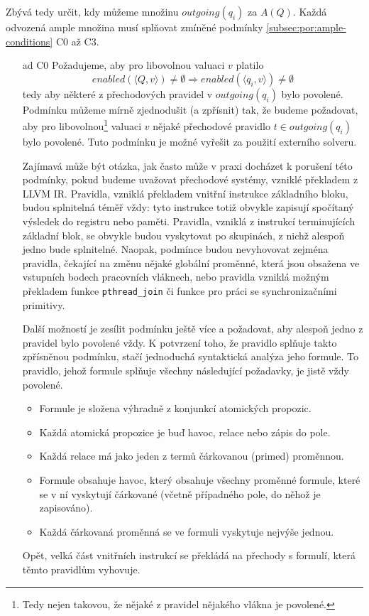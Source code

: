 \documentclass[12pt]{fithesis2}
\newcommand{\tuple}[1]{\langle #1 \rangle}
\begin{document}
Zbývá tedy určit, kdy můžeme množinu $\mathit{outgoing}(q_i)$ za $A(Q)$. Každá odvozená ample množina musí splňovat zmíněné podmínky \ref{subsec:por:ample-conditions} C0 až C3.
\begin{enumerate}
	\item[ad C0] Požadujeme, aby pro libovolnou valuaci $v$ platilo
	\begin{equation}
	\mathit{enabled}(\tuple{Q,v}) \neq \emptyset \Rightarrow \mathit{enabled}(\tuple{q_i,v}) \neq \emptyset
	\end{equation}		
	tedy aby některé z přechodových pravidel v $\mathit{outgoing}(q_i)$ bylo povolené. Podmínku můžeme mírně zjednodušit (a zpřísnit) tak, že budeme požadovat, aby pro libovolnou\footnote{Tedy nejen takovou, že nějaké z pravidel nějakého vlákna je povolené.} valuaci $v$ nějaké přechodové pravidlo $t \in \mathit{outgoing}(q_i)$ bylo povolené. Tuto podmínku je možné vyřešit za použití externího solveru.

	Zajímavá může být otázka, jak často může v praxi docházet k porušení této podmínky, pokud budeme uvažovat přechodové systémy, vzniklé překladem z LLVM IR. Pravidla, vzniklá překladem vnitřní instrukce základního bloku, budou splnitelná téměř vždy: tyto instrukce totiž obvykle zapisují spočítaný výsledek do registru nebo paměti. Pravidla, vzniklá z instrukcí terminujících základní blok, se obvykle budou vyskytovat po skupinách, z nichž alespoň jedno bude splnitelné. Naopak, podmínce budou nevyhovovat zejména pravidla, čekající na změnu nějaké globální proměnné, která jsou obsažena ve vstupních bodech pracovních vláknech, nebo pravidla vzniklá možným překladem funkce \texttt{pthread\_join} či funkce pro práci se synchronizačními primitivy.

	Další možností je zesílit podmínku ještě více a požadovat, aby alespoň jedno z pravidel bylo povolené vždy. K potvrzení toho, že pravidlo splňuje takto zpřísněnou podmínku, stačí jednoduchá syntaktická analýza jeho formule. To pravidlo, jehož formule splňuje všechny následující požadavky, je jistě vždy povolené.
	\begin{itemize}
		\item Formule je složena výhradně z konjunkcí atomických propozic.
		\item Každá atomická propozice je buď havoc, relace nebo zápis do pole.
		\item Každá relace má jako jeden z termů čárkovanou (primed) proměnnou.
		\item Formule obsahuje havoc, který obsahuje všechny proměnné formule, které se v ní vyskytují čárkované (včetně případného pole, do něhož je zapisováno).
		\item Každá čárkovaná proměnná se ve formuli vyskytuje nejvýše jednou.
	\end{itemize}
	Opět, velká část vnitřních instrukcí se překládá na přechody s formulí, která těmto pravidlům vyhovuje.


\end{enumerate}
\end{document}
